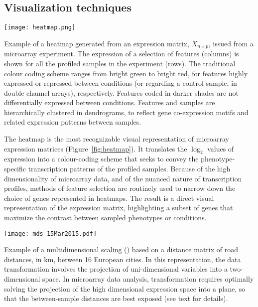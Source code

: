 \subsection{Visualization techniques}
\label{sec:methods-visualization}
\begin{marginfigure}%
    \texttt{[image: heatmap.png]}
    \caption[Example of a heatmap]{Example of a heatmap generated from an
      expression matrix, $X_{n \times p}$, issued from a 
      microarray experiment.  The expression of a selection of features
      (columns) is shown for all the profiled samples in the experiment (rows).
      The traditional colour coding scheme ranges from bright green to bright
      red, for features highly expressed or repressed between conditions (or
      regarding a control sample, in double channel arrays), respectively.
      Features coded in darker shades are not differentially expressed between
      conditions.  Features and samples are hierarchically clustered in
      dendrograms, to reflect gene co-expression motifs and related expression
      patterns between samples.}
    \label{fig:heatmap}%
\end{marginfigure}

The heatmap is the most recognizable visual representation of microarray
expression matrices (Figure~\ref{fig:heatmap}).  It translates the $\log_2$
values of expression into a colour-coding scheme that seeks to convey the
phenotype-specific transcription patterns of the profiled samples.  Because of
the high dimensionality of microarray data, and of the nuanced nature of
transcription profiles, methods of feature selection are routinely used to
narrow down the choice of genes represented in heatmaps.  The result is a direct
visual representation of the expression matrix, highlighting a subset of genes
that maximize the contrast between sampled phenotypes or conditions.


\begin{marginfigure}%
    \texttt{[image: mds-15Mar2015.pdf]}
    \caption[Example of a multidimesional scaling]{Example of a multidimensional
      scaling () based on a distance matrix of road distances, in
      km, between 16 European cities.  In this representation, the data
      transformation involves the projection of uni-dimensional variables into a
      two-dimensional space.  In microarray data analysis, 
      transformation requires optimally solving the projection of the high
      dimensional expression space into a plane, so that the between-sample
      distances are best exposed (see text for details).}
    \label{fig:mds}%
\end{marginfigure}

